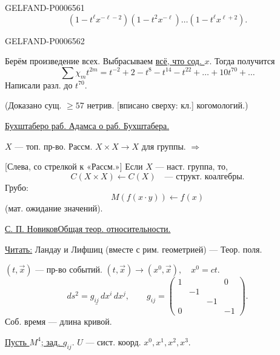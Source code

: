 \begin{GelfandAdjacentEvidence}{GELFAND-P000656}{1}
\[
(1-t^\ell x^{-\ell-2})(1-t^2x^{-\ell})\ldots(1-t^\ell x^{\ell+2}).
\]
\end{GelfandAdjacentEvidence}
\begin{GelfandAdjacentEvidence}{GELFAND-P000656}{2}


Берём произведение всех. Выбрасываем \underline{всё, что сод. \(x\)}. Тогда получится
\[
\sum\chi_m t^{2m}=t^{-2}+2-t^8-t^{14}-t^{22}+\ldots+10t^{70}+\ldots
\]
Написали разл. до \(t^{70}\).

(Доказано сущ. \(\geqslant57\) нетрив. [вписано сверху: кл.] когомологий.)

\underline{\underline{Бухштабер}}\quad \underline{о раб. Адамса о раб. Бухштабера.}

\(X\) --- топ. пр-во. Рассм. \(X\times X\to X\) для группы.
\(\Longrightarrow\)

[Слева, со стрелкой к «Рассм.»] Если \(X\) --- наст. группа, то,
\[
C(X\times X)\longleftarrow C(X)\quad\text{--- структ. коалгебры.}
\]
Грубо:
\[
M(f(x\cdot y))\longleftarrow f(x)
\]
(мат. ожидание значений).

\begin{center}\textemdash\enspace\textperiodcentered\enspace\textemdash\end{center}

\underline{\underline{С. П. Новиков}}\qquad \underline{Общая теор. относительности.}

\underline{Читать:} Ландау и Лифшиц (вместе с рим. геометрией) --- Теор. поля.

\((t,\vec x)\) --- пр-во событий. \((t,\vec x)\to(x^0,\vec x),\quad x^0=ct\).
\[
\underline{ds^2=g_{ij}\,dx^i\,dx^j},
\qquad
g_{ij}=\begin{pmatrix}
1&&&0\\&-1&&\\&&-1&\\0&&&-1
\end{pmatrix}.
\]
Соб. время --- длина кривой.

\underline{Пусть \(M^4\); зад. \(g_{ij}\)}.\qquad
\(U\) --- сист. коорд. \(x^0,x^1,x^2,x^3\).
\end{GelfandAdjacentEvidence}
